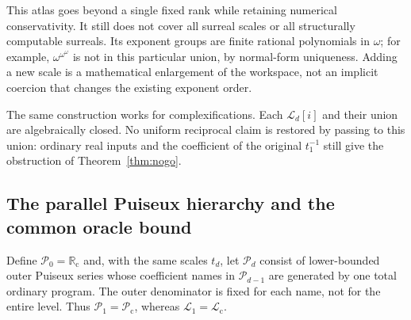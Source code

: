 \documentclass[11pt,letterpaper]{article}
\numberwithin{equation}{section}
\theoremstyle{definition}
\theoremstyle{remark}
\newcommand{\Rc}{\mathbb R_{\mathrm c}}
\newcommand{\Lc}{\mathcal L_{\mathrm c}}
\newcommand{\Pc}{\mathcal P_{\mathrm c}}
\begin{document}
This atlas goes beyond a single fixed rank while retaining numerical
conservativity. It still does not cover all surreal scales or all
structurally computable surreals. Its exponent groups are finite rational
polynomials in $\omega$; for example, $\omega^{\omega^\omega}$ is not
in this particular union, by normal-form uniqueness. Adding a new scale
is a mathematical enlargement of the workspace, not an implicit
coercion that changes the existing exponent order.

The same construction works for complexifications. Each $\mathcal L_d[i]$ and
their union are algebraically closed. No uniform reciprocal claim is
restored by passing to this union: ordinary real inputs and the coefficient
of the original $t_1^{-1}$ still give the obstruction of
Theorem~\ref{thm:nogo}.


\subsection{The parallel Puiseux hierarchy and the common oracle bound}
Define $\mathcal P_0=\Rc$ and, with the same scales $t_d$, let
$\mathcal P_d$ consist of lower-bounded outer Puiseux series whose coefficient
names in $\mathcal P_{d-1}$ are generated by one total ordinary program.
The outer denominator is fixed for each name, not for the entire level.
Thus $\mathcal P_1=\Pc$, whereas $\mathcal L_1=\Lc$.
\end{document}

